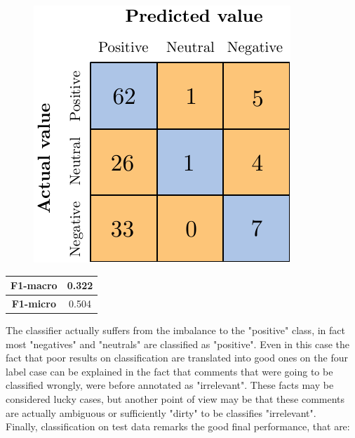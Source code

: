 \begin{figure}[H]
	\centering
	\includegraphics[scale=1]{figures/conf_matrices/ita_exteriors/ita_snt_exteriors_bpef_afs.pdf}
	\label{fig:ita_snt_exteriors_bpef_afs}
\end{figure}

\begin{center}
	\begin{tabular}{ | c | c | } 
		\hline
		\textbf{F1-macro} & 0.322 \\
		\hline
		\textbf{F1-micro} & 0.504 \\ 
		\hline
	\end{tabular}
\end{center}

The classifier actually suffers from the imbalance to the "positive" class, in fact most "negatives" and "neutrals" are classified as "positive". Even in this case the fact that poor results on classification are translated into good ones on the four label case can be explained in the fact that comments that were going to be classified wrongly, were before annotated as "irrelevant". These facts may be considered lucky cases, but another point of view may be that these comments are actually ambiguous or sufficiently "dirty" to be classifies "irrelevant".\\
Finally, classification on test data remarks the good final performance, that are:

